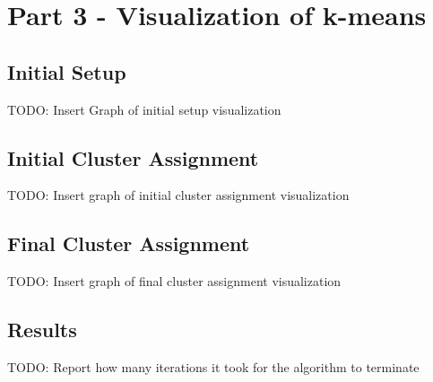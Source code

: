 \documentclass[12pt]{article}
\begin{document}
\newpage


\section*{Part 3 - Visualization of k-means}
\subsection*{Initial Setup}
TODO: Insert Graph of initial setup visualization
\subsection*{Initial Cluster Assignment}
TODO: Insert graph of initial cluster assignment visualization
\subsection*{Final Cluster Assignment}
TODO: Insert graph of final cluster assignment visualization
\subsection*{Results}
TODO: Report how many iterations it took for the algorithm to terminate
\end{document}
